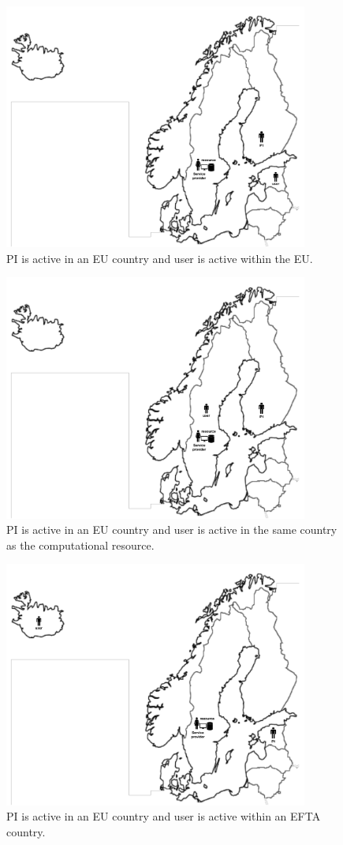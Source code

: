 \documentclass{article}
\begin{document}
\begin{figure}[!ht]
\centering
\includegraphics[width=10cm]{PI_EU_User_EU.pdf}
\caption{PI is active in an EU country and user is active within the EU.}\label{fig:eu_eu}
\end{figure}

\begin{figure}[!ht]
\centering
\includegraphics[width=10cm]{PI_EU_User_National.pdf}
\caption{PI is active in an EU country and user is active in the same country as the computational resource.}\label{fig:eu_nat}
\end{figure}

\begin{figure}[!ht]
\centering
\includegraphics[width=10cm]{PI_EU_User_EEA.pdf}
\caption{PI is active in an EU country and user is active within an EFTA country.}\label{fig:eu_eaa}
\end{figure}
\end{document}
